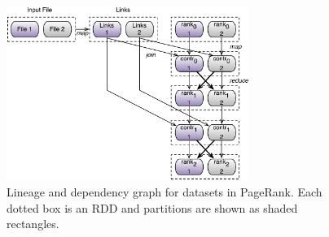 \begin{figure}
    \centering
    \includegraphics[width=0.7\textwidth]{figs/lineage.pdf}
    \caption{Lineage and dependency graph for datasets in PageRank. Each dotted box is an RDD and partitions are shown as shaded rectangles.}
    \label{fig:lineage}
\end{figure}

%

